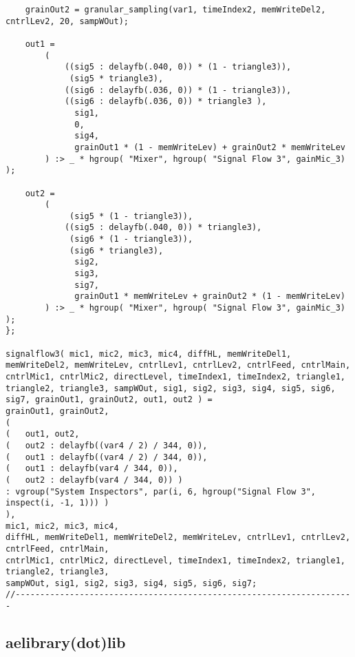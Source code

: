 \begin{lstlisting}
    grainOut2 = granular_sampling(var1, timeIndex2, memWriteDel2, cntrlLev2, 20, sampWOut);

    out1 =  
        ( 
            ((sig5 : delayfb(.040, 0)) * (1 - triangle3)),
             (sig5 * triangle3),
            ((sig6 : delayfb(.036, 0)) * (1 - triangle3)),
            ((sig6 : delayfb(.036, 0)) * triangle3 ),
              sig1,
              0,
              sig4,
              grainOut1 * (1 - memWriteLev) + grainOut2 * memWriteLev 
        ) :> _ * hgroup( "Mixer", hgroup( "Signal Flow 3", gainMic_3) );

    out2 =  
        ( 
             (sig5 * (1 - triangle3)),
            ((sig5 : delayfb(.040, 0)) * triangle3),
             (sig6 * (1 - triangle3)),
             (sig6 * triangle3),
              sig2,
              sig3,
              sig7,
              grainOut1 * memWriteLev + grainOut2 * (1 - memWriteLev) 
        ) :> _ * hgroup( "Mixer", hgroup( "Signal Flow 3", gainMic_3) );
};

signalflow3( mic1, mic2, mic3, mic4, diffHL, memWriteDel1, memWriteDel2, memWriteLev, cntrlLev1, cntrlLev2, cntrlFeed, cntrlMain, cntrlMic1, cntrlMic2, directLevel, timeIndex1, timeIndex2, triangle1, triangle2, triangle3, sampWOut, sig1, sig2, sig3, sig4, sig5, sig6, sig7, grainOut1, grainOut2, out1, out2 ) = 
grainOut1, grainOut2,
( 
(   out1, out2, 
(   out2 : delayfb((var4 / 2) / 344, 0)), 
(   out1 : delayfb((var4 / 2) / 344, 0)), 
(   out1 : delayfb(var4 / 344, 0)), 
(   out2 : delayfb(var4 / 344, 0)) ) 
: vgroup("System Inspectors", par(i, 6, hgroup("Signal Flow 3", inspect(i, -1, 1))) ) 
), 
mic1, mic2, mic3, mic4,
diffHL, memWriteDel1, memWriteDel2, memWriteLev, cntrlLev1, cntrlLev2, cntrlFeed, cntrlMain, 
cntrlMic1, cntrlMic2, directLevel, timeIndex1, timeIndex2, triangle1, triangle2, triangle3, 
sampWOut, sig1, sig2, sig3, sig4, sig5, sig6, sig7;
//---------------------------------------------------------------------
\end{lstlisting}

\subsection{aelibrary(dot)lib}

